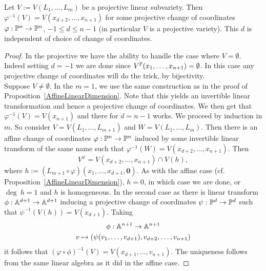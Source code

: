     \begin{proposition}
        Let $V:= V(L_1,\dots,L_m)$ be a projective linear subvariety. Then $\varphi^{-1}(V) = V(x_{d+2},\dots,x_{n+1})$ for some projective change of coordinates $\varphi: \mathbb{P}^n \rightarrow \mathbb{P}^n$, $-1\leq d\leq n-1$ (in particular $V$ is a projective variety). This $d$ is independent of choice of change of coordinates.
    \end{proposition}
    \begin{proof}
        In the projective we have the ability to handle the case where $V=\emptyset$. Indeed setting $d = -1$ we are done since $V^{\mathbb{P}}(x_1,\dots,x_{n+1})=\emptyset$. In this case any projective change of coordinates will do the trick, by bijectivity.\\  
        Suppose $V\neq \emptyset$. In the $m = 1$, we use the same construction as in the proof of Proposition~\ref{AffineLinearDimension}. Note that this yields an invertible linear transformation and hence a projective change of coordinates. We then get that $\varphi^{-1}(V)=V(x_{n+1})$ and there for $d=n-1$ works. We proceed by induction in $m$. So consider $V=V(L_1,\dots,L_{m+1})$ and $W=V(L_1,\dots,L_m)$. Then there is an affine change of coordinates $\varphi : \mathbb{P}^n \rightarrow \mathbb{P}^n$ induced by some invertible linear transform of the same name such that $\varphi^{-1}(W) = V(x_{d+2},\dots,x_{n+1})$. Then  
        $$V^\varphi = V(x_{d+2},\dots,x_{n+1})\cap V(h),$$
        where $h:= (L_{m+1}\circ \varphi)(x_1,\dots,x_{d+1},\mathbf{0})$. As with the affine case (cf. Proposition~\ref{AffineLinearDimension}), $h = 0$, in which case we are done, or $\deg\ h = 1$ and $h$ is homogeneous. In the second case as there is linear transform $\phi : \mathbb{A}^{d+1}\rightarrow \mathbb{A}^{d+1}$ inducing a projective change of coordinates $\psi : \mathbb{P}^d \rightarrow \mathbb{P}^d$ such that $\psi^{-1}(V(h))=V(x_{d+1})$. Taking 
        \begin{gather*}
            \phi : \mathbb{A}^{n+1}\rightarrow \mathbb{A}^{n+1}\\
            v\mapsto (\psi(v_1,\dots,v_{d+1}),v_{d+2},\dots,v_{n+1})
        \end{gather*}
        it follows that $(\varphi \circ \phi)^{-1}(V)=V(x_{d+1},\dots,v_{n+1})$.
        The uniqueness follows from the same linear algebra as it did in the affine case.
    \end{proof}

